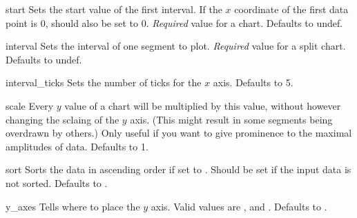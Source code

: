 \constructorblurb{\thisname}

\begin{AttrDecl}{start}
Sets the start value of the first interval. If the $x$ coordinate of
the first data point is 0,  should also be set to 0.
\emph{Required} value for a \thisclass chart. Defaults to undef.
\end{AttrDecl}

\begin{AttrDecl}{interval}
Sets the interval of one segment to plot. \emph{Required} value for a
split chart. Defaults to undef.
\end{AttrDecl}

\begin{AttrDecl}{interval\_ticks}
Sets the number of ticks for the $x$ axis. Defaults to 5.
\end{AttrDecl}

\begin{AttrDecl}{scale}
Every $y$ value of a \thisclass chart will be multiplied by this value,
without however changing the sclaing of the $y$ axis. (This might result
in some segments being overdrawn by others.) Only useful if you want to
give prominence to the maximal amplitudes of data. Defaults to 1.
\end{AttrDecl}

\begin{AttrDecl}{sort}
Sorts the data in ascending order if set to . Should be set if
the input data is not sorted. Defaults to .
\end{AttrDecl}

\begin{AttrDecl}{y\_axes}
Tells \thisclass where to place the $y$ axis. Valid
values are ,  and . Defaults
to .
\end{AttrDecl}

